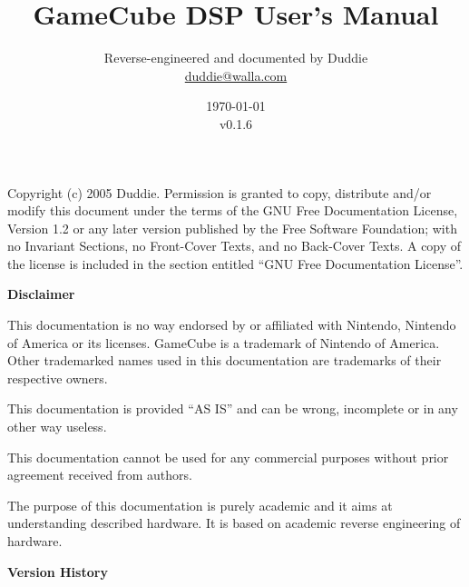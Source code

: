 \documentclass[oneside,english,a4paper,10pt,oneside,openany,final]{memoir}
\title{\textbf{\Huge GameCube DSP User's Manual}}
\author{Reverse-engineered and documented by Duddie \\ \href{mailto:duddie@walla.com}{duddie@walla.com}}
\date{\today\\v0.1.6}
\begin{document}
\maketitle{}

\pagebreak{}
\vspace*{\fill}

Copyright (c) 2005 Duddie. Permission is granted to copy, distribute and/or modify this document under the terms of the GNU Free Documentation License, Version 1.2 or any later version published by the Free Software Foundation; with no Invariant Sections, no Front-Cover Texts, and no Back-Cover Texts. A copy of the license is included in the section entitled ``GNU Free Documentation License''.

\pagebreak{}
\tableofcontents{}
\pagebreak{}

\textbf{\LARGE Disclaimer}
\vspace{5mm}

This documentation is no way endorsed by or affiliated with Nintendo, Nintendo of America or its licenses. GameCube is a trademark of Nintendo of America. Other trademarked names used in this documentation are trademarks of their respective owners.

This documentation is provided ``AS IS'' and can be wrong, incomplete or in any other way useless.

This documentation cannot be used for any commercial purposes without prior agreement received from authors.

The purpose of this documentation is purely academic and it aims at understanding described hardware. It is based on academic reverse engineering of hardware.

\pagebreak{}
\textbf{\LARGE Version History}
\vspace{5mm}
\end{document}
